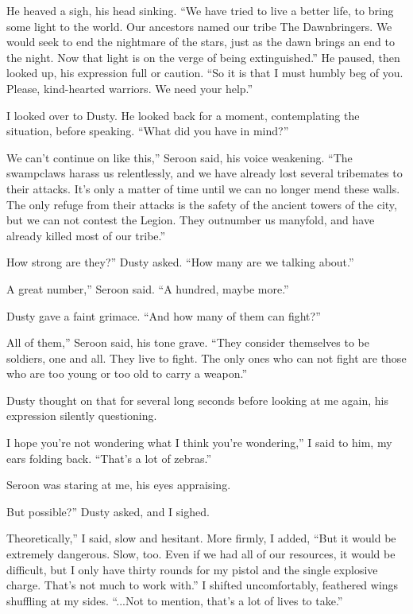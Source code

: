 He heaved a sigh, his head sinking. “We have tried to live a better life, to bring some light to the world. Our ancestors named our tribe The Dawnbringers. We would seek to end the nightmare of the stars, just as the dawn brings an end to the night. Now that light is on the verge of being extinguished.” He paused, then looked up, his expression full or caution. “So it is that I must humbly beg of you. Please, kind-hearted warriors. We need your help.”

I looked over to Dusty. He looked back for a moment, contemplating the situation, before speaking. “What did you have in mind?”

\leavevmode{}We can’t continue on like this,” Seroon said, his voice weakening. “The swampclaws harass us relentlessly, and we have already lost several tribemates to their attacks. It’s only a matter of time until we can no longer mend these walls. The only refuge from their attacks is the safety of the ancient towers of the city, but we can not contest the Legion. They outnumber us manyfold, and have already killed most of our tribe.”

\leavevmode{}How strong are they?” Dusty asked. “How many are we talking about.”

\leavevmode{}A great number,” Seroon said. “A hundred, maybe more.”

Dusty gave a faint grimace. “And how many of them can fight?”

\leavevmode{}All of them,” Seroon said, his tone grave. “They consider themselves to be soldiers, one and all. They live to fight. The only ones who can not fight are those who are too young or too old to carry a weapon.”

Dusty thought on that for several long seconds before looking at me again, his expression silently questioning.

\leavevmode{}I hope you’re not wondering what I think you’re wondering,” I said to him, my ears folding back. “That’s a lot of zebras.”

Seroon was staring at me, his eyes appraising.

\leavevmode{}But possible?” Dusty asked, and I sighed.

\leavevmode{}Theoretically,” I said, slow and hesitant. More firmly, I added, “But it would be extremely dangerous. Slow, too. Even if we had all of our resources, it would be difficult, but I only have thirty rounds for my pistol and the single explosive charge. That’s not much to work with.” I shifted uncomfortably, feathered wings shuffling at my sides. “...Not to mention, that’s a lot of lives to take.”

